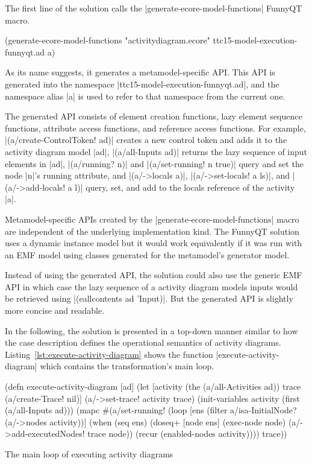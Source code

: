 \documentclass[submission]{eptcs}
\newcommand{\code}{\clojureinline}
\begin{document}
The first line of the solution calls the \code|generate-ecore-model-functions|
FunnyQT macro.

\begin{clojurecode}
(generate-ecore-model-functions "activitydiagram.ecore" ttc15-model-execution-funnyqt.ad a)
\end{clojurecode}

As its name suggests, it generates a metamodel-specific API.  This API is
generated into the namespace \code|ttc15-model-execution-funnyqt.ad|, and the
namespace alias \code|a| is used to refer to that namespace from the current
one.

The generated API consists of element creation functions, lazy element sequence
functions, attribute access functions, and reference access functions.  For
example, \code|(a/create-ControlToken! ad)| creates a new control token and
adds it to the activity diagram model \code|ad|, \code|(a/all-Inputs ad)|
returns the lazy sequence of input elements in \code|ad|, \code|(a/running? n)|
and \code|(a/set-running! n true)| query and set the node \code|n|'s
\textsf{running} attribute, and \code|(a/->locals a)|, \code|(a/->set-locals! a
ls)|, and \code|(a/->add-locals! a l)| query, set, and add to the
\textsf{locals} reference of the activity \code|a|.

Metamodel-specific APIs created by the \code|generate-ecore-model-functions|
macro are independent of the underlying implementation kind.  The FunnyQT
solution uses a dynamic instance model but it would work equivalently if it was
run with an EMF model using classes generated for the metamodel's generator
model.

Instead of using the generated API, the solution could also use the generic EMF
API in which case the lazy sequence of a activity diagram models inputs would
be retrieved using \code|(eallcontents ad 'Input)|.  But the generated API is
slightly more concise and readable.

\bigskip{}

In the following, the solution is presented in a top-down manner similar to how
the case description defines the operational semantics of activity diagrams.
Listing~\vref{lst:execute-activity-diagram} shows the function
\code|execute-activity-diagram| which contains the transformation's main loop.

\begin{listing}[h!tb]
\begin{clojurecode}
(defn execute-activity-diagram [ad]
  (let [activity (the (a/all-Activities ad))
        trace (a/create-Trace! nil)]
    (a/->set-trace! activity trace)
    (init-variables activity (first (a/all-Inputs ad)))
    (mapc #(a/set-running! %
    (loop [ens (filter a/isa-InitialNode? (a/->nodes activity))]
      (when (seq ens)
        (doseq+ [node ens]
          (exec-node node)
          (a/->add-executedNodes! trace node))
        (recur (enabled-nodes activity))))
    trace))
\end{clojurecode}
\caption{The main loop of executing activity diagrams}
\label{lst:execute-activity-diagram}
\end{listing}
\end{document}
